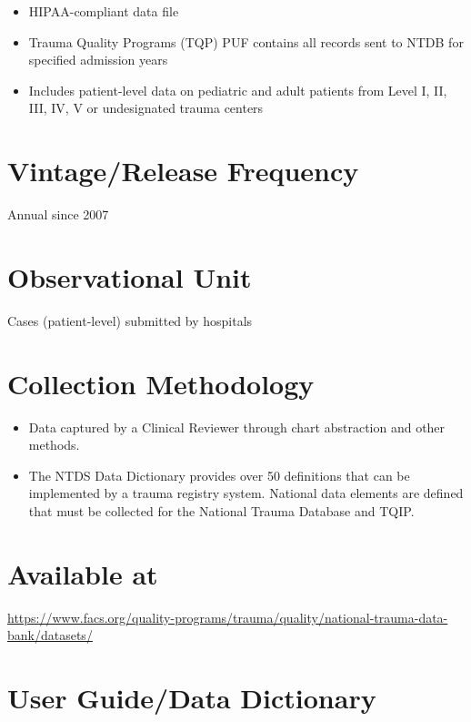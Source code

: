 \documentclass[
]{book}
\providecommand{\tightlist}{%
  \setlength{\itemsep}{0pt}\setlength{\parskip}{0pt}}
\begin{document}
\begin{itemize}
\tightlist
\item
  HIPAA-compliant data file
\item
  Trauma Quality Programs (TQP) PUF contains all records sent to NTDB for specified admission years
\item
  Includes patient-level data on pediatric and adult patients from Level I, II, III, IV, V or undesignated trauma centers
\end{itemize}

\hypertarget{vintagerelease-frequency-4}{%
\section{Vintage/Release Frequency}\label{vintagerelease-frequency-4}}

Annual since 2007

\hypertarget{observational-unit-4}{%
\section{Observational Unit}\label{observational-unit-4}}

Cases (patient-level) submitted by hospitals

\hypertarget{collection-methodology-4}{%
\section{Collection Methodology}\label{collection-methodology-4}}

\begin{itemize}
\tightlist
\item
  Data captured by a Clinical Reviewer through chart abstraction and other methods.
\item
  The NTDS Data Dictionary provides over 50 definitions that can be implemented by a trauma registry system. National data elements are defined that must be collected for the National Trauma Database and TQIP.
\end{itemize}

\hypertarget{available-at-4}{%
\section{Available at}\label{available-at-4}}

\url{https://www.facs.org/quality-programs/trauma/quality/national-trauma-data-bank/datasets/}

\hypertarget{user-guidedata-dictionary-4}{%
\section{User Guide/Data Dictionary}\label{user-guidedata-dictionary-4}}
\end{document}
